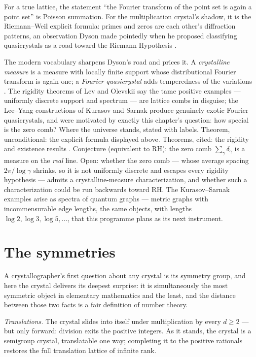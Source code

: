 \documentclass[11pt]{article}
\theoremstyle{remark}
\begin{document}
For a true lattice, the statement ``the Fourier transform of the point set is again a point set'' is
Poisson summation. For the multiplication crystal's shadow, it is the Riemann--Weil explicit formula:
primes and zeros are each other's diffraction patterns, an observation Dyson made pointedly when he
proposed classifying quasicrystals as a road toward the Riemann Hypothesis \cite{Dyson}.

The modern vocabulary sharpens Dyson's road and prices it. A \emph{crystalline measure} is a
measure with locally finite support whose distributional Fourier transform is again one; a
\emph{Fourier quasicrystal} adds temperedness of the variations \cite{Meyer, LevOlevskii}. The
rigidity theorems of Lev and Olevskii \cite{LevOlevskii} say the tame positive examples ---
uniformly discrete support and spectrum --- are lattice combs in disguise; the Lee--Yang
constructions of Kurasov and Sarnak \cite{KurasovSarnak} produce genuinely exotic Fourier
quasicrystals, and were motivated by exactly this chapter's question: how special is the zero
comb? Where the universe stands, stated with labels. Theorem, unconditional: the explicit
formula displayed above. Theorems, cited: the rigidity and existence results
\cite{LevOlevskii, KurasovSarnak}. Conjecture (equivalent to RH): the zero comb
$\sum_\gamma \delta_\gamma$ is a measure on the \emph{real} line. Open: whether the zero comb ---
whose average spacing $2\pi/\log\gamma$ shrinks, so it is not uniformly discrete and escapes
every rigidity hypothesis --- admits a crystalline-measure characterization, and whether such a
characterization could be run backwards toward RH. The Kurasov--Sarnak examples arise as spectra
of quantum graphs --- metric graphs with incommensurable edge lengths, the same objects, with
lengths $\log 2, \log 3, \log 5, \ldots$, that this programme plans as its next instrument.

\section{The symmetries}

A crystallographer's first question about any crystal is its symmetry group, and here the crystal
delivers its deepest surprise: it is simultaneously the most symmetric object in elementary
mathematics and the least, and the distance between those two facts is a fair definition of number
theory.

\emph{Translations.} The crystal slides into itself under multiplication by every $d \ge 2$ --- but
only forward: division exits the positive integers. As it stands, the crystal is a semigroup crystal,
translatable one way; completing it to the positive rationals restores the full translation lattice
of infinite rank.
\end{document}

